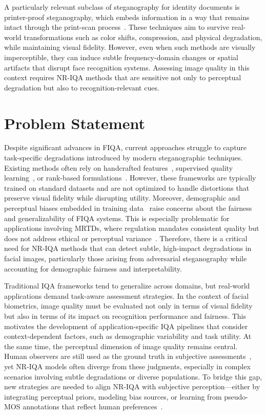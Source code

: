 A particularly relevant subclass of steganography for identity documents is printer-proof steganography, which embeds information in a way that remains intact through the print-scan process~\cite{codeface2021, stegastamp2020}. These techniques aim to survive real-world transformations such as color shifts, compression, and physical degradation, while maintaining visual fidelity. However, even when such methods are visually imperceptible, they can induce subtle frequency-domain changes or spatial artifacts that disrupt face recognition systems. Assessing image quality in this context requires NR-IQA methods that are sensitive not only to perceptual degradation but also to recognition-relevant cues.


\section{Problem Statement}\label{sec:problem_statement}

Despite significant advances in FIQA, current approaches struggle to capture task-specific degradations introduced by modern steganographic techniques. Existing methods often rely on handcrafted features~\cite{henniger2020biosig}, supervised quality learning~\cite{hernandez2019faceqnet, meng2021magface, terhorst2020serfiq}, or rank-based formulations~\cite{liu2017rankiqa}. However, these frameworks are typically trained on standard datasets and are not optimized to handle distortions that preserve visual fidelity while disrupting utility. Moreover, demographic and perceptual biases embedded in training data~\cite{babnik2022} raise concerns about the fairness and generalizability of FIQA systems. This is especially problematic for applications involving MRTDs, where regulation mandates consistent quality but does not address ethical or perceptual variance~\cite{icao_2015, iso_iec29794-5_2010}. Therefore, there is a critical need for NR-IQA methods that can detect subtle, high-impact degradations in facial images, particularly those arising from adversarial steganography while accounting for demographic fairness and interpretability.

Traditional IQA frameworks tend to generalize across domains, but real-world applications demand task-aware assessment strategies. In the context of facial biometrics, image quality must be evaluated not only in terms of visual fidelity but also in terms of its impact on recognition performance and fairness. This motivates the development of application-specific IQA pipelines that consider context-dependent factors, such as demographic variability and task utility. At the same time, the perceptual dimension of image quality remains central. Human observers are still used as the ground truth in subjective assessments~\cite{ITU-R-BT500, mos2016}, yet NR-IQA models often diverge from these judgments, especially in complex scenarios involving subtle degradations or diverse populations. To bridge this gap, new strategies are needed to align NR-IQA with subjective perception—either by integrating perceptual priors, modeling bias sources, or learning from pseudo-MOS annotations that reflect human preferences~\cite{chen2021pseudo, jin2020pipal}.


